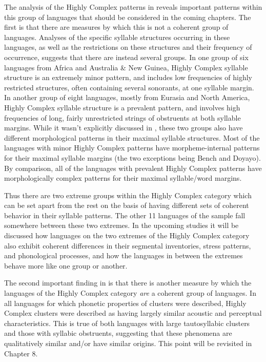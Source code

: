   The analysis of the Highly Complex patterns in  reveals important patterns within this group of languages that should be considered in the coming chapters. The first is that there are measures by which this is not a coherent group of languages. Analyses of the specific syllable structures occurring in these languages, as well as the restrictions on these structures and their frequency of occurrence, suggests that there are instead several groups. In one group of six languages from Africa and Australia \& New Guinea, Highly Complex syllable structure is an extremely minor pattern, and includes low frequencies of highly restricted structures, often containing several sonorants, at one syllable margin. In another group of eight languages, mostly from Eurasia and North America, Highly Complex syllable structure is a prevalent pattern, and involves high frequencies of long, fairly unrestricted strings of obstruents at both syllable margins. While it wasn’t explicitly discussed in , these two groups also have different morphological patterns in their maximal syllable structures. Most of the languages with minor Highly Complex patterns have morpheme-internal patterns for their maximal syllable margins (the two exceptions being Bench and Doyayo). By comparison, all of the languages with prevalent Highly Complex patterns have morphologically complex patterns for their maximal syllable/word margins.



  Thus there are two extreme groups within the Highly Complex category which can be set apart from the rest on the basis of having different sets of coherent behavior in their syllable patterns. The other 11 languages of the sample fall somewhere between these two extremes. In the upcoming studies it will be discussed how languages on the two extremes of the Highly Complex category also exhibit coherent differences in their segmental inventories, stress patterns, and phonological processes, and how the languages in between the extremes behave more like one group or another.



  The second important finding in  is that there is another measure by which the languages of the Highly Complex category \textit{are} a coherent group of languages. In all languages for which phonetic properties of clusters were described, Highly Complex clusters were described as having largely similar acoustic and perceptual characteristics. This is true of both languages with large tautosyllabic clusters and those with syllabic obstruents, suggesting that these phenomena are qualitatively similar and/or have similar origins. This point will be revisited in Chapter 8.


